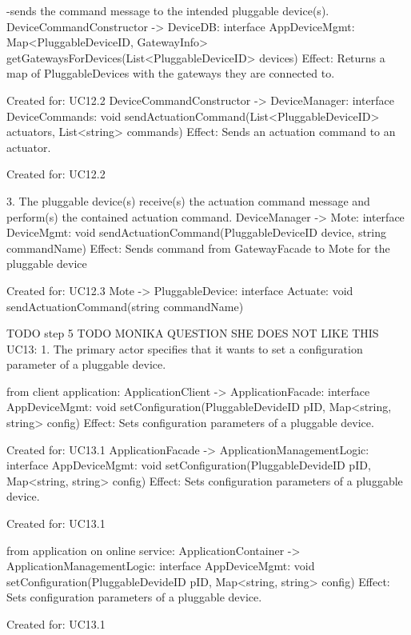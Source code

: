                 -sends the command message to the intended pluggable device(s).
                    DeviceCommandConstructor -> DeviceDB:      interface AppDeviceMgmt: Map<PluggableDeviceID, GatewayInfo> getGatewaysForDevices(List<PluggableDeviceID> devices)
                        Effect: Returns a map of PluggableDevices with the gateways they are connected to.
                        \item Created for: UC12.2
                    DeviceCommandConstructor -> DeviceManager: interface DeviceCommands: void sendActuationCommand(List<PluggableDeviceID> actuators, List<string> commands)
                        Effect: Sends an actuation command to an actuator.
                        \item Created for: UC12.2

            3. The pluggable device(s) receive(s) the actuation command message and perform(s) the contained actuation command.
                    DeviceManager -> Mote: interface DeviceMgmt: void sendActuationCommand(PluggableDeviceID device, string commandName)
                    Effect: Sends command from GatewayFacade to Mote for the pluggable device
                        \item Created for: UC12.3
                    Mote -> PluggableDevice: interface Actuate:    void sendActuationCommand(string commandName)


        TODO step 5
        TODO MONIKA QUESTION SHE DOES NOT LIKE THIS
        UC13:
            1. The primary actor specifies that it wants to set a configuration parameter of a pluggable device.

                from client application:
                    ApplicationClient -> ApplicationFacade:           interface AppDeviceMgmt:       void setConfiguration(PluggableDevideID pID, Map<string, string> config)
                        Effect: Sets configuration parameters of a pluggable device.
                        \item Created for: UC13.1
                    ApplicationFacade -> ApplicationManagementLogic:  interface AppDeviceMgmt:  void setConfiguration(PluggableDevideID pID, Map<string, string> config)
                        Effect: Sets configuration parameters of a pluggable device.
                        \item Created for: UC13.1

                from application on online service:
                    ApplicationContainer -> ApplicationManagementLogic: interface AppDeviceMgmt: void setConfiguration(PluggableDevideID pID, Map<string, string> config)
                        Effect: Sets configuration parameters of a pluggable device.
                        \item Created for: UC13.1

